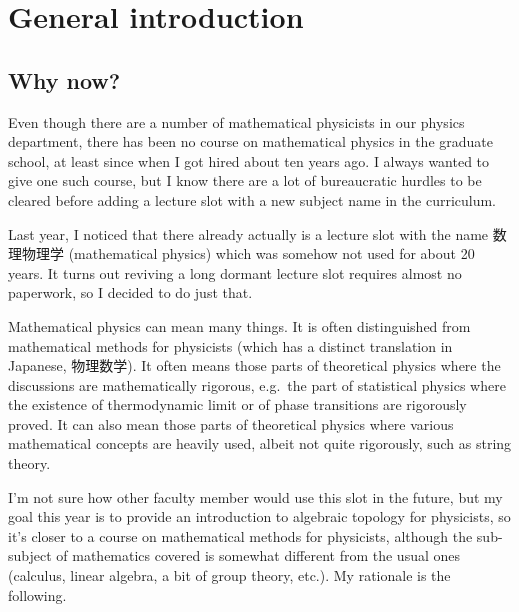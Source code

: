 \documentclass[12pt]{article}
\numberwithin{equation}{section}
\numberwithin{figure}{section}
\theoremstyle{remark}
\begin{document}
\section{General introduction}

\subsection{Why now?}
\label{sec:whynow}

Even though there are a number of mathematical physicists in our physics department,
there has been no course on mathematical physics in the graduate school,
at least since when I got hired about ten years ago.
I always wanted to give one such course, but I know 
there are a lot of bureaucratic hurdles to be cleared before adding a lecture slot with a new subject name in the curriculum.

Last year, I noticed that there already actually is a lecture slot with the name
数理物理学 (mathematical physics)
which was somehow not used for about 20 years.
It turns out reviving a long dormant lecture slot requires almost no paperwork,
so I decided to do just that.

Mathematical physics can mean many things. 
It is often distinguished from mathematical methods for physicists (which has a distinct translation in Japanese, 物理数学).
It often means those parts of theoretical physics where the discussions are mathematically rigorous,
e.g.~the part of statistical physics where the existence of thermodynamic limit or of phase transitions are rigorously proved.
It can also mean those parts of theoretical physics where various mathematical concepts are heavily used, albeit not quite rigorously,
such as string theory.


I'm not sure how other faculty member would use this slot in the future,
but my goal this year is to provide an introduction to algebraic topology for physicists,
so it's closer to a course on mathematical methods for physicists,
although the sub-subject of mathematics covered is somewhat different from the usual ones (calculus, linear algebra, a bit of group theory, etc.).
My rationale is the following.
\end{document}

